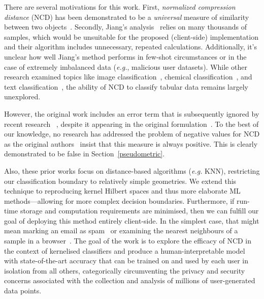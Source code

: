 \documentclass[preprint,12pt]{elsarticle}
\begin{document}
There are several motivations for this work.
First, \textit{normalized compression distance} (NCD) has been demonstrated to be a \textit{universal} measure of similarity between two objects~\cite{ncd}.
Secondly, Jiang's analysis~\cite{jiang2022less} relies on many thousands of samples, which would be unsuitable for the proposed (client-side) implementation and their algorithm includes unnecessary, repeated calculations.
Additionally, it's unclear how well Jiang's method performs in few-shot circumstances or in the case of extremely imbalanced data (\textit{e.g.}, malicious user datasets).
While other research examined topics like image classification~\cite{opitz2023gzip}, chemical classification~\cite{weinreich2023parameter}, and text classification~\cite{nishida2011tweet}, the ability of NCD to classify tabular data remains largely unexplored.

However, the original work includes an error term that is subsequently ignored by recent research ~\cite{opitz2023gzip,weinreich2023parameter,nishida2011tweet,jiang2022less}, despite it appearing in the original formulation~\cite{ncd}.
To the best of our knowledge, no research has addressed the problem of negative values for NCD as the original authors~\cite{ncd} insist that this measure is always positive. %
This is clearly demonstrated to be false in Section~\ref{pseudometric}.

Also, these prior works focus on distance-based algorithms  (\textit{e.g.} KNN), restricting our classification boundary to relatively simple geometries.
We extend this technique to reproducing kernel Hilbert spaces and thus more elaborate ML methods---allowing for more complex decision boundaries.
Furthermore, if run-time storage and computation requirements are minimised, then we can fulfill our goal of deploying this method entirely client-side.
In the simplest case, that might mean marking an email as spam~\cite{ansuz_email} or examining the nearest neighbours of a sample in a browser~\cite{ansuz_browser}.
The goal of the work is to explore the efficacy of NCD in the context of kernelised classifiers and produce a human-interpretable model with state-of-the-art accuracy that can be trained on and used by each user in isolation from all others, categorically circumventing the privacy and security concerns associated with the collection and analysis of millions of user-generated data points.
\end{document}
